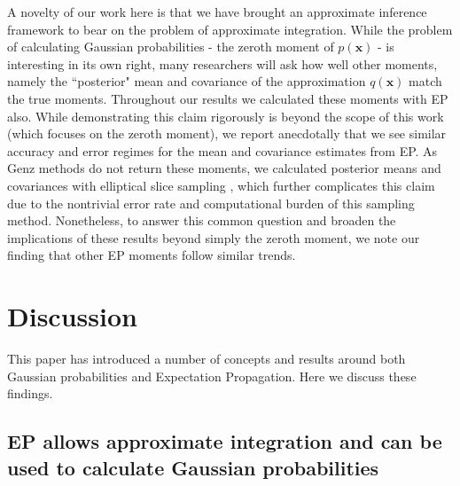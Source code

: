 \documentclass[twoside,11pt]{article}
\def\x{{\mathbf x}}
\begin{document}
A novelty of our work here is that we have brought an approximate inference framework to bear on the problem of approximate integration.   While the problem of calculating Gaussian probabilities - the zeroth moment of $p(\x)$ - is interesting in its own right, many researchers will ask how well other moments, namely the ``posterior" mean and covariance  of the approximation $q(\x)$ match the true moments.  Throughout our results we calculated these moments with EP also.  While demonstrating this claim rigorously is beyond the scope of this work (which focuses on the zeroth moment), we report anecdotally that we see similar accuracy and error regimes for the mean and covariance estimates from EP.    As Genz methods do not return these moments, we calculated posterior means and covariances with elliptical slice sampling \cite[]{murrayESS}, which further complicates this claim due to the nontrivial error rate and computational burden of this sampling method.   Nonetheless, to answer this common question and broaden the implications of these results beyond simply the zeroth moment, we note our finding that other EP moments follow similar trends.

\section{Discussion}
\label{sec:discussion}

This paper has introduced a number of concepts and results around both Gaussian probabilities and Expectation Propagation.  Here we discuss these findings.

\subsection{EP allows approximate integration and can be used to calculate Gaussian probabilities}
\end{document}
